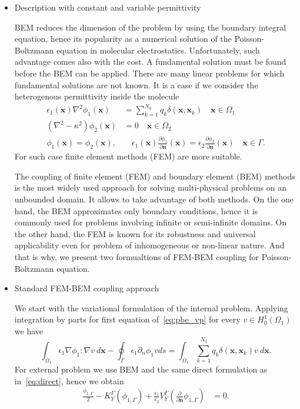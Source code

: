 \begin{itemize}
    \item Description with constant and variable permittivity 
    
BEM reduces the dimension of the problem by using the boundary integral equation, hence its popularity as a numerical solution of  the Poisson-Boltzmann equation in molecular electrostatics. Unfortunately, such advantage comes also with the cost. A fundamental solution must be found before the BEM can be applied. There are many linear problems for which fundamental solutions are not known. It is a case if we consider the heterogenous permittivity inside the molecule
   \begin{align} \label{eq:pbe_vp}
\epsilon_1(\mathbf{x}) \nabla^2\phi_1(\mathbf{x}) &= \sum_{k=1}^{N_q} q_k\delta(\mathbf{x},\mathbf{x}_k) \quad  \mathbf{x} \in \Omega_1\nonumber\\
\left(\nabla^2 - \kappa^2\right)\phi_2(\mathbf{x})  &= 0 \quad\mathbf{x}\in\Omega_2\nonumber\\
\phi_1(\mathbf{x})  = \phi_2(\mathbf{x}),  &\quad \epsilon_1(\mathbf{x})\frac{\partial\phi_1}{\partial\mathbf{n}}(\mathbf{x})  = \epsilon_2\frac{\partial\phi_2}{\partial\mathbf{n}}(\mathbf{x})  \quad \mathbf{x}\in \Gamma. 
\end{align}
For such case finite element methods (FEM) are more suitable.

The coupling of finite element (FEM) and boundary element (BEM) methods is the most widely used approach for solving multi-physical problems on an unbounded domain. It allows to take advantage of both methods. On the one hand, the BEM approximates only boundary conditions, hence it is commonly used for problems involving infinite or semi-infinite domains. On the other hand, the FEM is known for its robustness and universal applicability even for problem of inhomogeneous or non-linear nature.
And that is why, we present two formualtions of FEM-BEM coupling for Poisson-Boltzmann equation.
    
    \item Standard FEM-BEM coupling approach
   
    We start with the variational formulation of the internal problem. Applying integration by parts for first equation of~\eqref{eq:pbe_vp} for every $v \in H_0^1(\Omega_1)$ we have
\begin{equation}
\label{eq:fem}
 \int_{\Omega_1} \epsilon_1 \nabla \phi_1 : \nabla v ~d\mathbf{x}  - \oint_\Gamma \epsilon_1\partial_n \phi_1 v ds =   \int_{\Omega_1}  \sum_{k=1}^{N_q} q_k\delta(\mathbf{x},\mathbf{x}_k)  v ~d\mathbf{x}.
\end{equation}
For external problem we use BEM and the same direct formulation as in~\eqref{eq:direct}, hence we obtain
\begin{align*}
\frac{\phi_{1,\Gamma}}{2} - K_{Y}^{\Gamma}(\phi_{1,\Gamma}) + \frac{\epsilon_1}{\epsilon_2}V_{Y}^{\Gamma} \left( \frac{\partial}{\partial \mathbf{n}} \phi_{1,\Gamma} \right) & = 0.
\end{align*}


\end{itemize}

